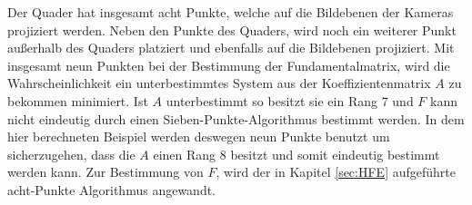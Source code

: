 

Der Quader hat insgesamt acht Punkte, welche auf die Bildebenen der Kameras projiziert werden. Neben den Punkte des Quaders, wird noch ein weiterer Punkt außerhalb des Quaders platziert und ebenfalls auf die Bildebenen projiziert. Mit insgesamt neun Punkten bei der Bestimmung der Fundamentalmatrix, wird die Wahrscheinlichkeit ein unterbestimmtes System aus der Koeffizientenmatrix $A$ zu bekommen minimiert. Ist $A$ unterbestimmt so besitzt sie ein Rang 7 und $F$ kann nicht eindeutig durch einen Sieben-Punkte-Algorithmus bestimmt werden\cite{HZ,LongQuan}. In dem hier berechneten Beispiel werden deswegen neun Punkte benutzt um sicherzugehen, dass die $A$ einen Rang 8 besitzt und somit eindeutig bestimmt werden kann. Zur Bestimmung von $F$, wird der in Kapitel \ref{sec:HFE} aufgeführte acht-Punkte Algorithmus angewandt.\\




